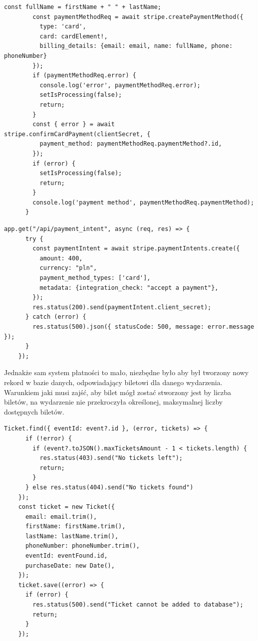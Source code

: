 \documentclass[12pt]{article}
\begin{document}
\begin{sloppypar}
{\begin{lstlisting}[caption=Obsługa przekazywania danych klienta na serwer w celu dokonania nowej płatności., captionpos=b]
        const fullName = firstName + " " + lastName;
        const paymentMethodReq = await stripe.createPaymentMethod({
          type: 'card', 
          card: cardElement!,
          billing_details: {email: email, name: fullName, phone: phoneNumber}
        });
        if (paymentMethodReq.error) {
          console.log('error', paymentMethodReq.error);
          setIsProcessing(false);
          return;
        }
        const { error } = await stripe.confirmCardPayment(clientSecret, {
          payment_method: paymentMethodReq.paymentMethod?.id,
        });
        if (error) {
          setIsProcessing(false);
          return;
        }
        console.log('payment method', paymentMethodReq.paymentMethod);
      }
  \end{lstlisting}
  \begin{lstlisting}[caption=Podstawowy system obsługi płatności przez serwer, captionpos=b]
    app.get("/api/payment_intent", async (req, res) => {
      try {
        const paymentIntent = await stripe.paymentIntents.create({
          amount: 400,
          currency: "pln",
          payment_method_types: ['card'],
          metadata: {integration_check: "accept a payment"},
        });
        res.status(200).send(paymentIntent.client_secret);
      } catch (error) {
        res.status(500).json({ statusCode: 500, message: error.message });
      }
    });
  \end{lstlisting}
  Jednakże sam system płatności to mało, niezbędne było aby był tworzony nowy rekord w bazie danych, odpowiadający biletowi dla danego wydarzenia. 
  Warunkiem jaki musi zajść, aby bilet mógł zostać stworzony jest by liczba biletów, na wydarzenie nie przekroczyła określonej, maksymalnej liczby dostępnych biletów.
  \begin{lstlisting}[caption=Tworzenie nowego biletu w bazie danych., captionpos=b]
    Ticket.find({ eventId: event?.id }, (error, tickets) => {
      if (!error) {
        if (event?.toJSON().maxTicketsAmount - 1 < tickets.length) {
          res.status(403).send("No tickets left");
          return;
        }
      } else res.status(404).send("No tickets found") 
    });
    const ticket = new Ticket({
      email: email.trim(),
      firstName: firstName.trim(),
      lastName: lastName.trim(),
      phoneNumber: phoneNumber.trim(),
      eventId: eventFound.id,
      purchaseDate: new Date(),
    });
    ticket.save((error) => {
      if (error) {
        res.status(500).send("Ticket cannot be added to database");
        return;
      }
    });
  \end{lstlisting}
}
\end{sloppypar}
\end{document}
